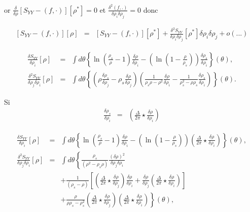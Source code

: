 	or $\frac{\delta}{\delta \rho } \left [ S_{YY}  - (   f ,  \cdot  )  \right ] [\rho^\ast  ] = 0$ et $\frac{\delta^2 ( f , . ) }{\delta \rho_i \delta \rho_j  } = 0 $ donc 
	
	\begin{eqnarray}
		\left [ S_{YY}  - (   f ,  \cdot  )  \right ] [\rho ] & = &  \left [ S_{YY}  - (   f ,  \cdot  )  \right ] [\rho^\ast  ]  + 	\frac{\delta^2 S_{YY} }{\delta \rho_i \delta \rho_j  }   [\rho^\ast  ] \delta \rho_i \delta \rho_j + o (...) 
	\end{eqnarray} 
	
	\begin{aff}
		
		\begin{eqnarray}
			\frac{ \delta S_{YY} }{ \delta \rho_i } [\rho ]  & = & \int  d\theta \left \{ \ln \left ( \frac{ \rho_s}{ \rho} - 1 \right )\frac{\delta \rho }{ \delta \rho_i } -  \left ( \ln \left ( 1 - \frac{ \rho}{ \rho_s}\right ) \right )\frac{\delta \rho_s }{ \delta \rho_i } \right \} ( \theta ) ,\\	
			\frac{ \delta^2 S_{YY} }{ \delta \rho_j\delta \rho_i } [\rho ]  & = & 	\int  d\theta\left \{ \left ( \rho \frac{\delta \rho_s}{\delta \rho_j}- \rho_s\frac{\delta \rho}{\delta \rho_j} \right ) \left ( \frac{1}{\rho_s\rho -\rho^2 }\frac{\delta \rho}{\delta \rho_i}  - \frac{1}{\rho_s^2 - \rho\rho_s}\frac{\delta \rho_s}{\delta \rho_i} \right )  \right \}(\theta).
		\end{eqnarray}
		
		Si 
		\begin{eqnarray}
			\frac{\delta \rho_s}{\delta \rho_i}   & = &\left  ( \frac{\Delta}{2\pi} \star \frac{\delta \rho}{\delta \rho_i}  \right ) 	
		\end{eqnarray}
		
		\begin{eqnarray}
			\frac{ \delta S_{YY} }{ \delta \rho_i } [\rho ]  & = & \int  d\theta \left \{ \ln \left ( \frac{ \rho_s}{ \rho} - 1 \right )\frac{\delta \rho }{ \delta \rho_i } -  \left ( \ln \left ( 1 - \frac{ \rho}{ \rho_s}\right ) \right ) \left ( \frac{ \Delta}{2 \pi} \star \frac{\delta \rho }{ \delta \rho_i }  \right)\right \} ( \theta ) ,\\
			\frac{ \delta^2 S_{YY} }{ \delta \rho_j\delta \rho_i } [\rho ]  & = & \int  d\theta\left \{  \frac{\rho_s}{(\rho^2  - \rho_s\rho)} \frac{(\delta \rho)^2}{\delta \rho_j \delta \rho_i} \right . \\
		&  &  +  \left . \frac{1}{(\rho_s -\rho) } \left [ \left (  \frac{\Delta}{2\pi} \star\frac{\delta \rho}{\delta \rho_j}   \right ) \frac{\delta \rho}{\delta \rho_i}+ \frac{\delta \rho}{\delta \rho_j} \left (  \frac{\Delta}{2\pi} \star\frac{\delta \rho}{\delta \rho_i} \right )  \right ] \right . \\
		& & + \left .  \frac{\rho }{\rho\rho_s - \rho_s^2 }\left (  \frac{\Delta}{2\pi} \star\frac{\delta \rho}{\delta \rho_j} \right )\left (  \frac{\Delta}{2\pi} \star\frac{\delta \rho}{\delta \rho_i} \right )  \right \}(\theta),
	\end{eqnarray}
	

\end{aff}
